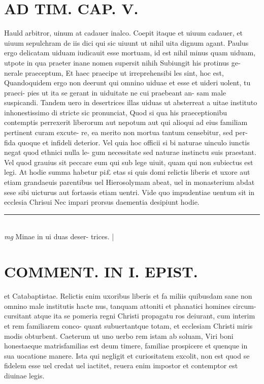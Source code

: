 \documentclass{article}
\begin{document}
\begin{pages}
\section*{AD TIM. CAP. V. }
\marginpar{[ p.151 ]}\pstart Hauld arbitror, uinum at cadauer inalco. Coepit itaque et uiuum cadauer, et uiuum sepulchram de iis dici qui sic uiuunt ut nihil uita dignum agant. Paulus ergo delicatam uiduam iudicauit esse mortuam, id est nihil minus quam uiduam, utpote in qua praeter inane nomen supersit nihih Subiungit his protinus ge- nerale praeceptum, Et haec praecipe ut irreprehensibi les sint, hoc est, Quandoquidem ergo non deerunt qui omnino uiduae et esse et uideri uolent, tu praeci- pies ut ita se gerant in uiduitate ne cui praebeant an- sam male suspicandi. Tandem uero in desertrices illas uiduas ut absterreat a uitae instituto inhonestissimo di stricte sic pronunciat, Quod si qua his praeceptionibu contemptis perrexerit liberorum aut nepotum aut qui alioqui ad eius familiam pertinent curam excute- re, ea merito non mortua tantum censebitur, sed per- fida quoque et infideli deterior. Vel quia hoc officii si bi naturae uinculo iunctis negat quod ethnici nulla le- gum necessitate sed naturae instinctu suis praestant. Vel quod grauius sit peccare eum qui sub lege uiuit, quam qui non subiectus est legi. At hodie summa habetur pi£ etas si quis domi relictis liberis et uxore aut etiam grandaeuis parentibus uel Hierosolymam abeat, uel in monasterium abdat sese sibi uicturus aut fortassis etiam uentri. Vide quo impudentiae uentum sit in ecclesia Chrisui Nec impari prorsus daementia desipiunt hodie.  \pend
\vspace{0.5cm}\noindent
\vspace{0.2cm}\rule{1cm}{0.2pt}\\ 
\hspace{0.2cm}\textit{mg}
\footnotesize Minae in ui duas deser- trices. 
\normalsize| 
\section*{COMMENT. IN I. EPIST. }\pstart et Catabaptistae. Relictis enim uxoribus liberis et fa miliis quibusdam sane non omnino male institutis hacte nus, tanquam attoniti et phanatici homines circum- cursitant atque ita se pomeria regni Christi propagatu ros deiurant, cum interim et rem familiarem conco- quant subuertantque totam, et ecclesiam Christi miris modis obturbent. Caeterum ut uno uerbo rem istam ab soluam, Viri boni honestaeque matrisfamilias est deum timere, familiae prospicere et quenque in sua uocatione manere. Ista qui negligit et curiositatem excolit, non est quod se fidelem esse uel credat uel iactitet, reuera enim impostor et contemptor est diuinae legis.  \pend
{}
{}

\end{pages}
\end{document}
